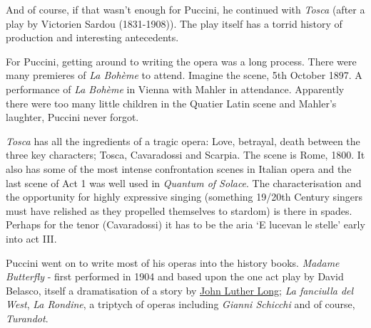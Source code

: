 And of course, if that wasn't enough for Puccini, he continued with \textit{Tosca} (after a play by Victorien Sardou (1831-1908)). The play itself has a torrid history of production and interesting antecedents.

For Puccini, getting around to writing the opera was a long process. There were many premieres of \textit{La Boh\`eme} to attend. Imagine the scene, 5th October 1897. A performance of \textit{La Boh\`eme} in Vienna with Mahler in attendance. Apparently there were too many little children in the Quatier Latin scene and Mahler's laughter, Puccini never forgot.   

\textit{Tosca} has all the ingredients of a tragic opera: Love, betrayal, death between the three key characters; Tosca, Cavaradossi and Scarpia. The scene is Rome, 1800. It also has some of the most intense confrontation scenes in Italian opera and the last scene of Act 1 was well used in \textit{Quantum of Solace}. The characterisation and the opportunity for highly expressive singing (something 19/20th Century singers must have relished as they propelled themselves to stardom) is there in spades. Perhaps for the tenor (Cavaradossi) it has to be the aria `E lucevan le stelle' early into act III. 

Puccini went on to write most of his operas into the history books. \textit{Madame Butterfly} - first performed in 1904 and based upon the one act play by David Belasco, itself a dramatisation of a story by \href{http://home.earthlink.net/~markdlew/pdfs/MButLong-091799.pdf}{John Luther Long}; \textit{La fanciulla del West}, \textit{La Rondine}, a triptych of operas including \textit{Gianni Schicchi} and of course, \textit{Turandot}.
  









